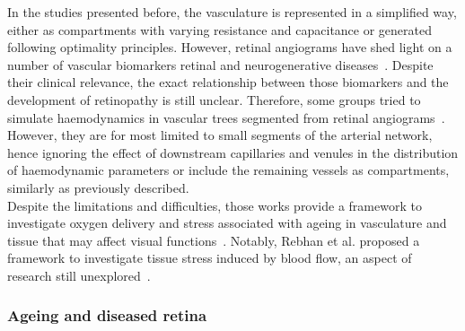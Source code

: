 \documentclass[12pt,a4paper]{journal}
\begin{document}
In the studies presented before, the vasculature is represented in a simplified way, either as compartments with varying resistance and capacitance or generated following optimality principles.
However, retinal angiograms have shed light on a number of vascular biomarkers retinal and neurogenerative diseases~\cite{Chalam_2016,Tsokolas_2020}.
Despite their clinical relevance, the exact relationship between those biomarkers and the development of retinopathy is still unclear.
Therefore, some groups tried to simulate haemodynamics in vascular trees segmented from retinal angiograms~\cite{Aletti_2016, Malek_2015, Liu_2009, Rebhan_2019}.
However, they are for most limited to small segments of the arterial network, hence ignoring the effect of downstream capillaries and venules in the distribution of haemodynamic parameters or include the remaining vessels as compartments, similarly as previously described.\\
Despite the limitations and difficulties, those works provide a framework to investigate oxygen delivery and stress associated with ageing in vasculature and tissue that may affect visual functions~\cite{Rickett_2010,Sim_2013,Wessel_2012}.
Notably, Rebhan et al. proposed a framework to investigate tissue stress induced by blood flow, an aspect of research still unexplored~\cite{Rebhan_2019}.

\break

\subsubsection{Ageing and diseased retina}
\end{document}
